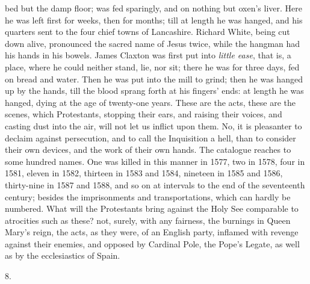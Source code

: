 bed but the damp floor; was fed sparingly, and on nothing
but oxen's liver. Here he was left first for weeks, then
for months; till at length he was hanged, and his
quarters sent to the four chief towns of Lancashire.
Richard White, being cut down alive, pronounced the
sacred name of Jesus twice, while the hangman had his
hands in his bowels. James Claxton was first put into \emph{little ease}, that is, a place, where he could neither
stand, lie, nor sit; there he was for three days, fed on
bread and water. Then he was put into the mill to grind;
then he was hanged up by the hands, till the blood sprang
forth at his fingers' ends: at length he was hanged,
dying at the age of twenty-one years. These are the acts,
these are the scenes, which Protestants, stopping their
ears, and raising their voices, and casting dust into the
air, will not let us inflict upon them. No, it is
pleasanter to declaim against persecution, and to call
the Inquisition a hell, than to consider their own
devices, and the work of their own hands. The catalogue
reaches to some hundred names. One was killed in this
manner in 1577, two in 1578, four in 1581, eleven in
1582, thirteen in 1583 and 1584, nineteen in 1585 and
1586, thirty-nine in 1587 and 1588, and so on at
intervals to the end of the seventeenth century; besides
the imprisonments and transportations, which can hardly
be numbered. What will the Protestants bring against the
Holy See comparable to atrocities such as these? not,
surely, with any fairness, the burnings in Queen Mary's
reign, the acts, as they were, of an English party,
inflamed with revenge against their enemies, and opposed
by Cardinal Pole, the Pope's Legate, as well as by the
ecclesiastics of Spain.

8.

